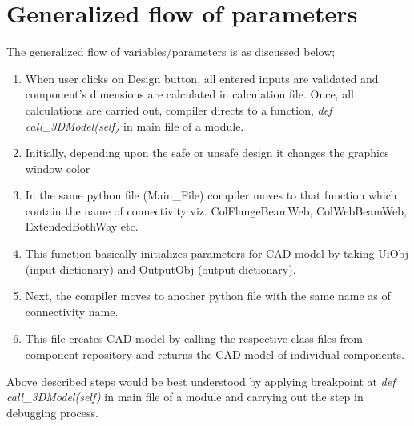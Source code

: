 \section{Generalized flow of parameters}
The generalized flow of variables/parameters is as discussed below;
\begin{enumerate}
	\item When user clicks on Design button, all entered inputs are validated and component's dimensions are calculated in calculation file. Once, all calculations are carried out, compiler directs to a function, \textit{def call\_3DModel(self)} in main file of a module.
	\item Initially, depending upon the safe or unsafe design it changes the graphics window color
	\item  In the same python file (Main\_File) compiler moves to that function which contain the name of connectivity viz. ColFlangeBeamWeb, ColWebBeamWeb, ExtendedBothWay etc.
	\item This function basically initializes parameters for CAD model by taking UiObj (input dictionary) and OutputObj (output dictionary).
	\item Next, the compiler moves to another python file with the same name as of connectivity name.
	\item This file creates CAD model by calling the respective class files from component repository and returns the CAD model of individual components.
\end{enumerate}
Above described steps would be best understood by applying breakpoint at \textit{def call\_3DModel(self)} in main file of a module and carrying out the step in debugging process.

